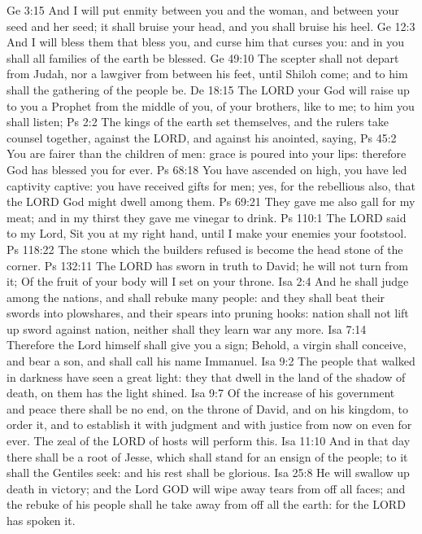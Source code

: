 Ge 3:15  And I will put enmity between you and the woman, and between your seed and her seed; it shall bruise your head, and you shall bruise his heel.
Ge 12:3  And I will bless them that bless you, and curse him that curses you: and in you shall all families of the earth be blessed.
Ge 49:10  The scepter shall not depart from Judah, nor a lawgiver from between his feet, until Shiloh come; and to him shall the gathering of the people be.
De 18:15  The LORD your God will raise up to you a Prophet from the middle of you, of your brothers, like to me; to him you shall listen;
Ps 2:2  The kings of the earth set themselves, and the rulers take counsel together, against the LORD, and against his anointed, saying,
Ps 45:2  You are fairer than the children of men: grace is poured into your lips: therefore God has blessed you for ever.
Ps 68:18  You have ascended on high, you have led captivity captive: you have received gifts for men; yes, for the rebellious also, that the LORD God might dwell among them.
Ps 69:21  They gave me also gall for my meat; and in my thirst they gave me vinegar to drink.
Ps 110:1  The LORD said to my Lord, Sit you at my right hand, until I make your enemies your footstool.
Ps 118:22  The stone which the builders refused is become the head stone of the corner.
Ps 132:11  The LORD has sworn in truth to David; he will not turn from it; Of the fruit of your body will I set on your throne.
Isa 2:4  And he shall judge among the nations, and shall rebuke many people: and they shall beat their swords into plowshares, and their spears into pruning hooks: nation shall not lift up sword against nation, neither shall they learn war any more.
Isa 7:14  Therefore the Lord himself shall give you a sign; Behold, a virgin shall conceive, and bear a son, and shall call his name Immanuel.
Isa 9:2  The people that walked in darkness have seen a great light: they that dwell in the land of the shadow of death, on them has the light shined.
Isa 9:7  Of the increase of his government and peace there shall be no end, on the throne of David, and on his kingdom, to order it, and to establish it with judgment and with justice from now on even for ever. The zeal of the LORD of hosts will perform this.
Isa 11:10  And in that day there shall be a root of Jesse, which shall stand for an ensign of the people; to it shall the Gentiles seek: and his rest shall be glorious.
Isa 25:8  He will swallow up death in victory; and the Lord GOD will wipe away tears from off all faces; and the rebuke of his people shall he take away from off all the earth: for the LORD has spoken it.
